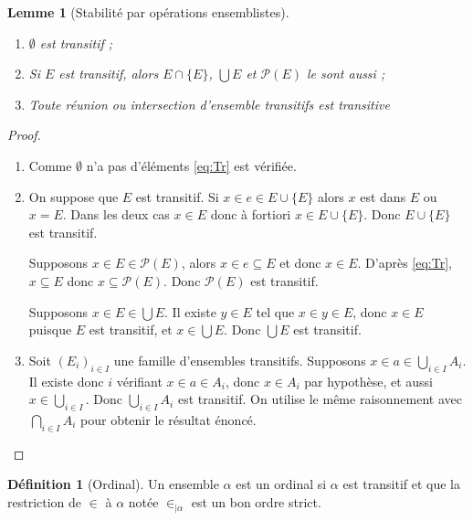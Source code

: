 \documentclass[french]{article}
\theoremstyle{definition}
\newtheorem{definition}[subsubsection]{Définition}
\theoremstyle{plain}
\theoremstyle{plain}
\theoremstyle{plain}
\newtheorem{lemma}[subsubsection]{Lemme}
\theoremstyle{plain}
\theoremstyle{plain}
\begin{document}
\begin{lemma}[Stabilité par opérations ensemblistes]
	\begin{enumerate}[label = (\roman*)]
		\item \( \emptyset \) est transitif ;
		\item Si \( E \) est transitif, alors \( E \cap \{E\} \), \( \bigcup E \) et \( \mathcal{P}(E) \) le sont aussi ;
		\item Toute réunion ou intersection d'ensemble transitifs est transitive
	\end{enumerate}
\end{lemma}

\begin{proof}
	\begin{enumerate}[label = (\roman*)]
		\item Comme \( \emptyset \) n'a pas d'éléments \eqref{eq:Tr} est vérifiée.
		\item On suppose que \( E \) est transitif. Si \( x \in e \in E \cup \{E\} \) alors \( x \) est dans \( E \) ou \( x = E \). Dans les deux cas \( x \in E \) donc à fortiori \( x \in E \cup \{E\} \). Donc \( E \cup \{E\} \) est transitif.

			Supposons \( x \in E \in \mathcal{P}(E) \), alors \( x \in e \subseteq E \) et donc \( x \in E \). D'après \eqref{eq:Tr}, \( x \subseteq E \) donc \( x \subseteq \mathcal{P}(E)\). Donc \( \mathcal{P}(E) \) est transitif.

			Supposons \( x \in E \in \bigcup E \). Il existe \( y \in E \) tel que \( x \in y \in E \), donc \( x \in E \) puisque \( E \) est transitif, et \( x \in \bigcup E \). Donc \( \bigcup E \) est transitif.
		\item Soit \( (E_{i})_{i \in I} \) une famille d'ensembles transitifs. Supposons \( x \in a \in \bigcup_{i\in I} A_{i} \). Il existe donc \( i \) vérifiant \( x \in a \in A_{i} \), donc \( x \in A_{i} \) par hypothèse, et aussi \( x \in \bigcup_{i \in I}\). Donc \( \bigcup_{i \in I} A_{i} \) est transitif. On utilise le même raisonnement avec \( \bigcap_{i \in I} A_{i} \) pour obtenir le résultat énoncé.
	\end{enumerate}
\end{proof}

\begin{definition}[Ordinal]
	Un ensemble \( \alpha \) est un ordinal si \( \alpha \) est transitif et que la restriction de \( \in  \) à \( \alpha \) notée \( \in_{|\alpha} \) est un bon ordre strict.
\end{definition}
\end{document}
